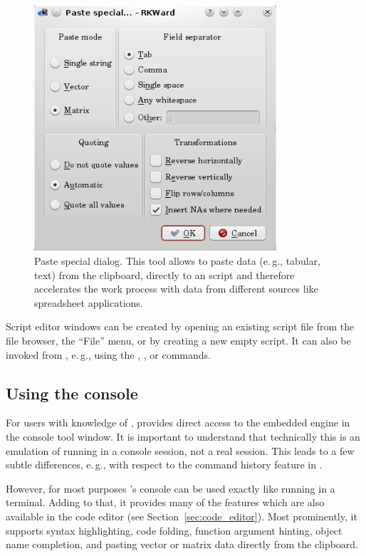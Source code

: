 \begin{figure}[t!]
 \centering
 \includegraphics[width=9.0cm]{./figures/special_paste.png}
 \caption{Paste special dialog. This tool allows to paste data (e.\,g., tabular, text) from the clipboard, directly to an 
  script and therefore accelerates the work process with data from different sources 
 like spreadsheet applications.
}
 \label{fig:special_paste}
\end{figure}

Script editor windows can be created by opening an existing
 script file from the file browser, the
``File'' menu, or by creating a new empty script. It can
also be invoked from , e.\,g., using the
, , or 
commands.

\subsection[Using the R console]{Using the  console}
\label{sec:using_R_console}
For users with knowledge of ,  provides direct access to the
embedded  engine in the
 console tool window. It is important to understand that technically this is an
emulation of  running in a console
session, not a real  session. This leads to a few subtle
differences, e.\,g., with respect to the command history feature in
.

However, for most purposes 's  console can be used exactly
like  running in a terminal. Adding to that, it provides many of the
features which are also available in the code editor (see Section~\ref{sec:code_editor}).
Most prominently, it supports syntax highlighting, code
folding, function argument hinting, object name completion, and pasting
vector or matrix data directly from the clipboard.

